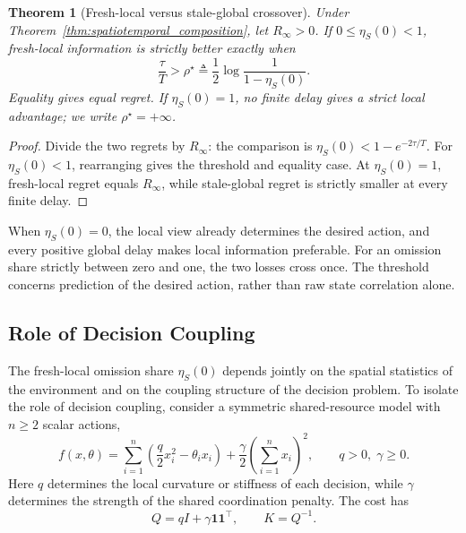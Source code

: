 \documentclass[11pt]{article}
\newtheorem{theorem}{Theorem}
\begin{document}
\begin{theorem}[Fresh-local versus stale-global crossover]
\label{thm:local_global_crossover}
Under Theorem~\ref{thm:spatiotemporal_composition}, let $R_\infty>0$.
If $0\le\eta_S(0)<1$, fresh-local information is strictly better exactly when
\begin{equation}
\boxed{\frac{\tau}{T}>\rho^\star
\triangleq\frac12\log\frac{1}{1-\eta_S(0)}.}
\label{eq:OU_crossover}
\end{equation}
Equality gives equal regret. If $\eta_S(0)=1$, no finite delay gives a
strict local advantage; we write $\rho^\star=+\infty$.
\end{theorem}
\begin{proof}
Divide the two regrets by $R_\infty$: the comparison is
$\eta_S(0)<1-e^{-2\tau/T}$. For $\eta_S(0)<1$, rearranging gives
the threshold and equality case. At $\eta_S(0)=1$, fresh-local regret
equals $R_\infty$, while stale-global regret is strictly smaller at
every finite delay.
\end{proof}
When $\eta_S(0)=0$, the local view already determines the desired action,
and every positive global delay makes local information preferable.
For an omission share strictly between zero and one, the two losses cross
once. The threshold concerns prediction of the desired action, rather than
raw state correlation alone.

\subsection{Role of Decision Coupling}
\label{subsec:coupling_example}

The fresh-local omission share $\eta_S(0)$ depends jointly on the
spatial statistics of the environment and on the coupling structure of the
decision problem. To isolate the role of decision coupling, consider a
symmetric shared-resource model with $n\ge2$ scalar actions,
\begin{equation}
    f(x,\theta)
    =
    \sum_{i=1}^{n}
    \left(
        \frac{q}{2}x_i^2-\theta_i x_i
    \right)
    +
    \frac{\gamma}{2}
    \left(
        \sum_{i=1}^{n}x_i
    \right)^2,
    \qquad
    q>0,\;\gamma\ge0.
    \label{eq:shared_resource_cost}
\end{equation}
Here $q$ determines the local curvature or stiffness of each decision, while
$\gamma$ determines the strength of the shared coordination penalty. The cost has
\begin{equation}
    Q
    =
    qI+\gamma\mathbf{1}\mathbf{1}^\top,
    \qquad
    K=Q^{-1}.
    \label{eq:shared_resource_Q}
\end{equation}
\end{document}
